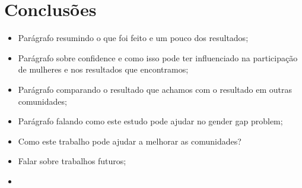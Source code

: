 \chapter{Conclusões}

\begin{itemize}
	\item Parágrafo resumindo o que foi feito e um pouco dos resultados;
	\item Parágrafo sobre confidence e como isso pode ter influenciado na participação de mulheres e nos resultados que encontramos;
	\item Parágrafo comparando o resultado que achamos com o resultado em outras comunidades;
	\item Parágrafo falando como este estudo pode ajudar no gender gap problem;
	\item Como este trabalho pode ajudar a melhorar as comunidades?
	\item Falar sobre trabalhos futuros;
	\item 
\end{itemize}